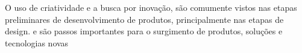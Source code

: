 O uso de criatividade e a busca por inovação, são comumente vistos nas etapas preliminares de desenvolvimento de produtos, principalmente nas etapas de design. \cite{chen_artificial_2019} e são passos importantes para o surgimento de produtos, soluções e tecnologias novas\cite{edwards_if_2022}